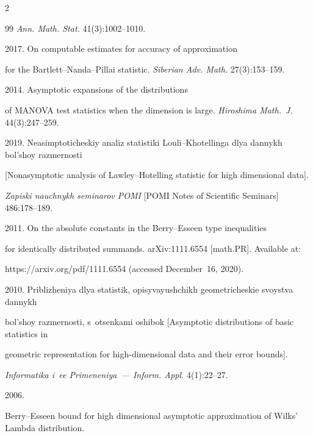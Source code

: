 \begin{multicols}{2}
{{\begin{thebibliography}{99}
\textit{Ann. Math. Stat.} 41(3):1002--1010.




 2017. On computable estimates for accuracy of approximation


 for the Bartlett--Nanda--Pillai statistic. \textit{Siberian Adv. Math.} 27(3):153--159.




 2014. Asymptotic expansions of the distributions 


of MANOVA test statistics when the dimension is large. \textit{Hiroshima Math.~J.} 44(3):247--259.






 2019. Neasimptoticheskiy analiz statistiki Louli--Khotellinga dlya dannykh bol'shoy razmernosti 


 [Nonasymptotic analysis of Lawley--Hotelling statistic for high dimensional data]. 


 \textit{Zapiski nauchnykh seminarov POMI} [POMI Notes of Scientific Seminars] 486:178--189.




 2011. On the absolute constants in the Berry--Esseen type inequalities 


for identically distributed summands. arXiv:1111.6554 [math.PR]. Available at: 


{\sf https://arxiv.org/pdf/1111.6554} (accessed December~16, 2020).






 2010. Priblizheniya dlya statistik, opisyvayushchikh geo\-met\-ri\-che\-skie svoystva dannykh 


 bol'shoy razmernosti, s~otsenkami oshibok [Asymptotic distributions of basic statistics in 


 geometric representation for high-dimensional data and their error bounds]. 


 \textit{Informatika i~ee Primeneniya~--- Inform. Appl.} 4(1):22--27.




 2006. 


Berry--Esseen bound for high dimensional asymptotic approximation of Wilks' Lambda distribution. 



\end{thebibliography}}}
\end{multicols}
